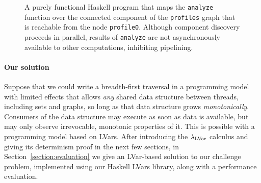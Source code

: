 \begin{figure}
  
  \caption{\footnotesize A purely functional Haskell program that maps the \lstinline|analyze| function over the connected
    component of the \lstinline|profiles| graph that is reachable from the node \lstinline|profile0|.  Although component discovery proceeds in parallel, results of
    \lstinline|analyze| are not asynchronously available to other computations, inhibiting pipelining.}
  \label{f:bfs-pure}
\end{figure}


\paragraph{Our solution}
%
Suppose that we could write a breadth-first traversal in a programming model with
limited effects
that allows {\em any} shared data structure between threads, including sets and
graphs, so long as that data structure grows {\em monotonically}.
Consumers of the data structure may execute as soon as data is available, but 
may only observe irrevocable, monotonic properties of it.
This is possible with a programming model based on LVars.  After 
introducing the $\lambda_{\textrm{LVar}}$ calculus and giving its determinism proof in the next few
sections, in Section~\ref{section:evaluation} we give an LVar-based
solution to our challenge problem, implemented using our Haskell LVars library, along with a
performance evaluation.

